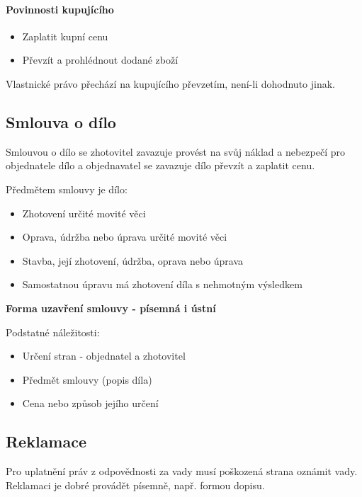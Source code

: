 \paragraph*{Povinnosti kupujícího}
\begin{itemize}
    \item Zaplatit kupní cenu
    \item Převzít a prohlédnout dodané zboží
\end{itemize}
Vlastnické právo přechází na kupujícího převzetím, není-li dohodnuto jinak.

\subsection*{Smlouva o dílo}
Smlouvou o dílo se zhotovitel zavazuje provést na svůj náklad a nebezpečí pro objednatele dílo a objednavatel se zavazuje dílo převzít a zaplatit cenu.

Předmětem smlouvy je dílo:
\begin{itemize}
    \item Zhotovení určité movité věci
    \item Oprava, údržba nebo úprava určité movité věci
    \item Stavba, její zhotovení, údržba, oprava nebo úprava
    \item Samostatnou úpravu má zhotovení díla s nehmotným výsledkem
\end{itemize}

\textbf{Forma uzavření smlouvy - písemná i ústní}

Podstatné náležitosti:
\begin{itemize}
    \item Určení stran - objednatel a zhotovitel
    \item Předmět smlouvy (popis díla)
    \item Cena nebo způsob jejího určení	
\end{itemize}

\subsection*{Reklamace}
Pro uplatnění práv z odpovědnosti za vady musí poškozená strana oznámit vady.
Reklamaci je dobré provádět písemně, např. formou dopisu.


